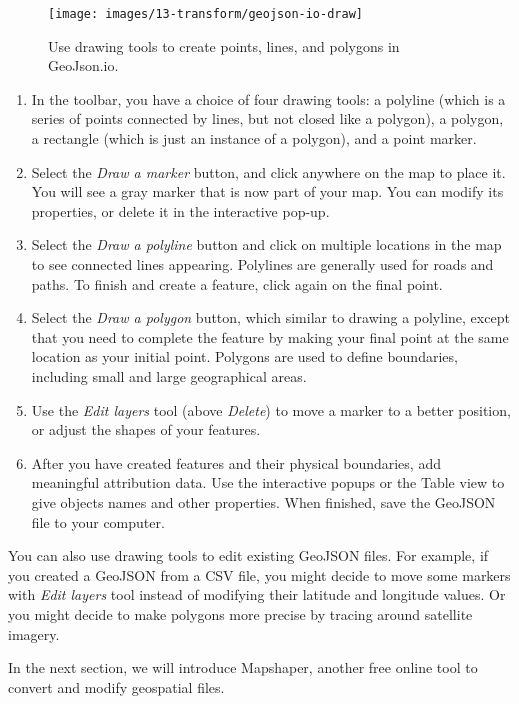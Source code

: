 \documentclass[
  english,
]{book}
\begin{document}
\begin{figure}
\texttt{[image: images/13-transform/geojson-io-draw]} \caption{Use drawing tools to create points, lines, and polygons in GeoJson.io.}\label{fig:geojson-io-draw}
\end{figure}

\begin{enumerate}
\def\labelenumi{\arabic{enumi}.}
\setcounter{enumi}{3}
\item
  In the toolbar, you have a choice of four drawing tools: a polyline (which is a series
  of points connected by lines, but not closed like a polygon), a polygon, a rectangle
  (which is just an instance of a polygon), and a point marker.
\item
  Select the \emph{Draw a marker} button, and click anywhere on the map to place it.
  You will see a gray marker that is now part of your map. You can modify its properties,
  or delete it in the interactive pop-up.
\item
  Select the \emph{Draw a polyline} button and click on multiple locations in the map to see
  connected lines appearing. Polylines are generally used for roads and paths. To finish and create a feature, click again on the final point.
\item
  Select the \emph{Draw a polygon} button, which similar to drawing a polyline, except that you need to complete
  the feature by making your final point at the same location as your initial point.
  Polygons are used to define boundaries, including small and large geographical areas.
\item
  Use the \emph{Edit layers} tool (above \emph{Delete}) to move a marker to a better position,
  or adjust the shapes of your features.
\item
  After you have created features and their physical boundaries, add
  meaningful attribution data. Use the interactive popups or the Table view to give objects names and other properties. When finished, save the GeoJSON file to your computer.
\end{enumerate}

You can also use drawing tools to edit existing GeoJSON files. For example,
if you created a GeoJSON from a CSV file, you might decide to move some markers
with \emph{Edit layers} tool instead of modifying their latitude and longitude values.
Or you might decide to make polygons more precise by tracing around satellite imagery.

In the next section, we will introduce Mapshaper, another free online tool
to convert and modify geospatial files.
\end{document}
